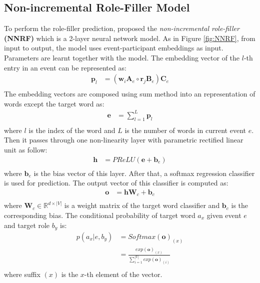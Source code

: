 \documentclass[a4paper]{article}
\begin{document}
\subsection{Non-incremental Role-Filler Model} \label{sec:nnrf}
To perform the role-filler prediction, \citet{tilk2016event} proposed the \textit{non-incremental role-filler} \textbf{(NNRF)} which is a 2-layer neural network model. As in Figure \ref{fig:NNRF}, from input to output, the model uses event-participant embeddings as input. Parameters are learnt together with the model. The embedding vector of the $l$-th entry in an event can be represented as:
\begin{equation} \label{eq:rbe-nnrf}
\begin{aligned}
    \mathbf{p}_l
        &= (\mathbf{w}_i \mathbf{A}_e \circ \mathbf{r}_j \mathbf{B}_e) \mathbf{C}_e \\
\end{aligned}
\end{equation}
The embedding vectors are composed using sum method into an representation of words except the target word as:
\begin{equation} \label{eq:sum-comp}
\begin{aligned}
    \mathbf{e}
        &= \sum_{l=1}^{L} \mathbf{p}_{l} \\
\end{aligned}
\end{equation}
where $l$ is the index of the word and $L$ is the number of words in current event $e$. Then it passes through one non-linearity layer with parametric rectified linear unit \citep{he2015delving} as follow:
\begin{equation} \label{eq:nonlinearity-nnrf}
\begin{aligned}
    \mathbf{h}
        &= PReLU(\mathbf{e} + \mathbf{b}_e) \\
\end{aligned}
\end{equation}
where $\mathbf{b}_e$ is the bias vector of this layer. After that, a softmax regression classifier is used for prediction. The output vector of this classifier is computed as:
\begin{equation} \label{eq:output-nnrf}
\begin{aligned}
    \mathbf{o}
        &= \mathbf{h}\mathbf{W}_c + \mathbf{b}_c \\
\end{aligned}
\end{equation}
where $\mathbf{W}_c\in \mathbb{R}^{d \times |V|}$ is a weight matrix of the target word classifier and $\mathbf{b}_c$ is the corresponding bias. The conditional probability of target word $a_x$ given event $e$ and target role $b_y$ is:
\begin{equation} \label{eq:softmax-nnrf}
\begin{aligned}
    p(a_x | e, b_y)
        &= Softmax(\mathbf{o})_{(x)} \\
        &= \frac{
        exp(\mathbf{o})_{(x)}
        }{
        \sum_{i=1}^{|V|} exp(\mathbf{o})_{(i)} }   \\
\end{aligned}
\end{equation}
where suffix $(x)$ is the $x$-th element of the vector. 
\end{document}
